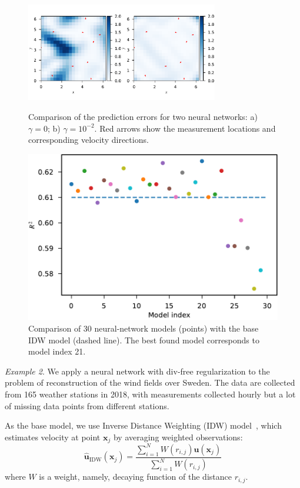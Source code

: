\documentclass[pamm,a4paper,fleqn]{w-art}
\renewcommand{\vec}[1]{\boldsymbol{#1}}
\begin{document}
\begin{figure}
\begin{minipage}{0.48\textwidth}
  \includegraphics[width=3.3in]{assets/error-fields-comparison.pdf}
  \caption{Comparison of the prediction errors for two neural networks:
    a) $\gamma=0$; b) $\gamma=10^{-2}$.
    Red arrows show the measurement locations and corresponding
  velocity directions.}%
  \label{fig:tg2d}
\end{minipage}
\hfill
\begin{minipage}{0.48\textwidth}
  \centering
  \includegraphics[scale=0.42]{assets/r2-vs-model.pdf}
  \caption{Comparison of 30 neural-network models (points)
    with the base IDW model (dashed line).
  The best found model corresponds to model index 21.}%
  \label{fig:r2-vs-model}
\end{minipage}
\end{figure}

\emph{Example 2}.
We apply a neural network with div-free regularization to the problem of
reconstruction of the wind fields over Sweden.
The data are collected from 165 weather stations in 2018, with measurements
collected hourly but a lot of missing data points from different stations.

As the base model, we use Inverse Distance Weighting (IDW)
model~\cite{Cellura2008}, which
estimates velocity at point $\vec x_j$ by averaging weighted observations:
\begin{equation}
  \label{eq:base-model}
  \hat{\vec u}_{\text{IDW}}(\vec x_j) =
  \frac{\sum_{i=1}^N W(r_{i,j}) \vec u(\vec x_j)}{\sum_{i=1}^N W(r_{i,j})}
\end{equation}
where $W$ is a weight, namely, decaying function of the distance $r_{i, j}$.
\end{document}
